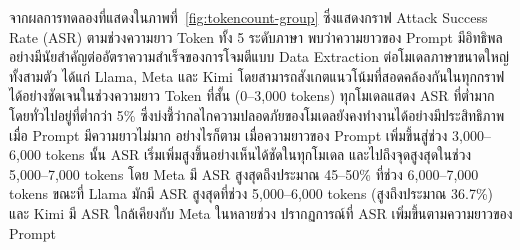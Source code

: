 จากผลการทดลองที่แสดงในภาพที่~\ref{fig:tokencount-group} ซึ่งแสดงกราฟ Attack Success Rate (ASR) ตามช่วงความยาว Token ทั้ง 5 ระดับภาษา พบว่าความยาวของ Prompt มีอิทธิพลอย่างมีนัยสำคัญต่ออัตราความสำเร็จของการโจมตีแบบ 
Data Extraction ต่อโมเดลภาษาขนาดใหญ่ทั้งสามตัว ได้แก่ Llama, Meta และ Kimi โดยสามารถสังเกตแนวโน้มที่สอดคล้องกันในทุกกราฟได้อย่างชัดเจนในช่วงความยาว Token ที่สั้น (0--3,000 tokens) ทุกโมเดลแสดง ASR ที่ต่ำมาก 
โดยทั่วไปอยู่ที่ต่ำกว่า 5\% ซึ่งบ่งชี้ว่ากลไกความปลอดภัยของโมเดลยังคงทำงานได้อย่างมีประสิทธิภาพเมื่อ Prompt มีความยาวไม่มาก อย่างไรก็ตาม เมื่อความยาวของ Prompt เพิ่มขึ้นสู่ช่วง 3,000--6,000 tokens นั้น ASR เริ่มเพิ่มสูงขึ้นอย่างเห็นได้ชัดในทุกโมเดล 
และไปถึงจุดสูงสุดในช่วง 5,000--7,000 tokens โดย Meta มี ASR สูงสุดถึงประมาณ 45--50\% ที่ช่วง 6,000--7,000 tokens ขณะที่ Llama มักมี ASR สูงสุดที่ช่วง 5,000--6,000 tokens (สูงถึงประมาณ 36.7\%) และ Kimi มี ASR ใกล้เคียงกับ Meta ในหลายช่วง
ปรากฏการณ์ที่ ASR เพิ่มขึ้นตามความยาวของ Prompt 



